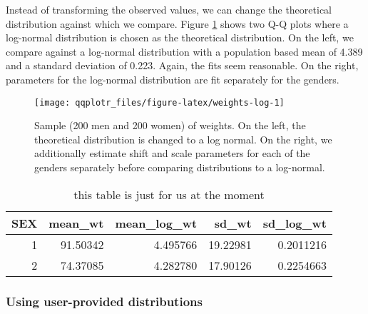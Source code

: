 Instead of transforming the observed values, we can change the
theoretical distribution against which we compare. Figure
\ref{fig:weights-log} shows two Q-Q plots where a log-normal
distribution is chosen as the theoretical distribution. On the left, we
compare against a log-normal distribution with a population based mean
of 4.389 and a standard deviation of 0.223. Again, the fits seem
reasonable. On the right, parameters for the log-normal distribution are
fit separately for the genders.

\begin{Schunk}
\begin{figure}

{\centering \texttt{[image: qqplotr\_files/figure-latex/weights-log-1]} 

}

\caption[Sample (200 men and 200 women) of weights]{Sample (200 men and 200 women) of weights. On the left, the theoretical distribution  is changed to a log normal. On the right, we additionally estimate shift and scale parameters for each of the genders separately before comparing distributions to a log-normal.}\label{fig:weights-log}
\end{figure}
\end{Schunk}

\begin{table}

\caption{\label{tab:table}this table is just for us at the moment}
\centering
\begin{tabular}[t]{r|r|r|r|r}
\hline
SEX & mean\_wt & mean\_log\_wt & sd\_wt & sd\_log\_wt\\
\hline
1 & 91.50342 & 4.495766 & 19.22981 & 0.2011216\\
\hline
2 & 74.37085 & 4.282780 & 17.90126 & 0.2254663\\
\hline
\end{tabular}
\end{table}

\subsubsection{Using user-provided
distributions}\label{using-user-provided-distributions}

\label{sec:user-dists}

